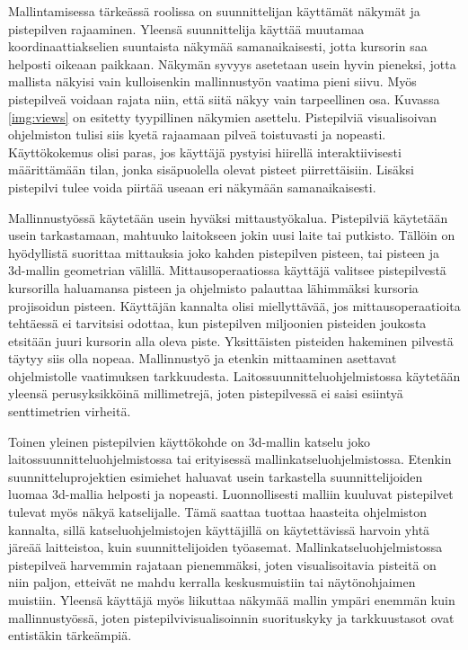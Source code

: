 Mallintamisessa tärkeässä roolissa on suunnittelijan käyttämät näkymät ja pistepilven rajaaminen. Yleensä suunnittelija käyttää muutamaa koordinaattiakselien suuntaista näkymää samanaikaisesti, jotta kursorin saa helposti oikeaan paikkaan. Näkymän syvyys asetetaan usein hyvin pieneksi, jotta mallista näkyisi vain kulloisenkin mallinnustyön vaatima pieni siivu. Myös pistepilveä voidaan rajata niin, että siitä näkyy vain tarpeellinen osa. Kuvassa \ref{img:views} on esitetty tyypillinen näkymien asettelu. Pistepilviä visualisoivan ohjelmiston tulisi siis kyetä rajaamaan pilveä toistuvasti ja nopeasti. Käyttökokemus olisi paras, jos käyttäjä pystyisi hiirellä interaktiivisesti määrittämään tilan, jonka sisäpuolella olevat pisteet piirrettäisiin. Lisäksi pistepilvi tulee voida piirtää useaan eri näkymään samanaikaisesti.

Mallinnustyössä käytetään usein hyväksi mittaustyökalua. Pistepilviä käytetään usein tarkastamaan, mahtuuko laitokseen jokin uusi laite tai putkisto. Tällöin on hyödyllistä suorittaa mittauksia joko kahden pistepilven pisteen, tai pisteen ja 3d-mallin geometrian välillä. Mittausoperaatiossa käyttäjä valitsee pistepilvestä kursorilla haluamansa pisteen ja ohjelmisto palauttaa lähimmäksi kursoria projisoidun pisteen. Käyttäjän kannalta olisi miellyttävää, jos mittausoperaatioita tehtäessä ei tarvitsisi odottaa, kun pistepilven miljoonien pisteiden joukosta etsitään juuri kursorin alla oleva piste. Yksittäisten pisteiden hakeminen pilvestä täytyy siis olla nopeaa. Mallinnustyö ja etenkin mittaaminen asettavat ohjelmistolle vaatimuksen tarkkuudesta. Laitossuunnitteluohjelmistossa käytetään yleensä perusyksikköinä millimetrejä, joten pistepilvessä ei saisi esiintyä senttimetrien virheitä.

Toinen yleinen pistepilvien käyttökohde on 3d-mallin katselu joko laitossuunnitteluohjelmistossa tai erityisessä mallinkatseluohjelmistossa. Etenkin suunnitteluprojektien esimiehet haluavat usein tarkastella suunnittelijoiden luomaa 3d-mallia helposti ja nopeasti. Luonnollisesti malliin kuuluvat pistepilvet tulevat myös näkyä katselijalle. Tämä saattaa tuottaa haasteita ohjelmiston kannalta, sillä katseluohjelmistojen käyttäjillä on käytettävissä harvoin yhtä järeää laitteistoa, kuin suunnittelijoiden työasemat. Mallinkatseluohjelmistossa pistepilveä harvemmin rajataan pienemmäksi, joten visualisoitavia pisteitä on niin paljon, etteivät ne mahdu kerralla keskusmuistiin tai näytönohjaimen muistiin. Yleensä käyttäjä myös liikuttaa näkymää mallin ympäri enemmän kuin mallinnustyössä, joten pistepilvivisualisoinnin suorituskyky ja tarkkuustasot ovat entistäkin tärkeämpiä.

